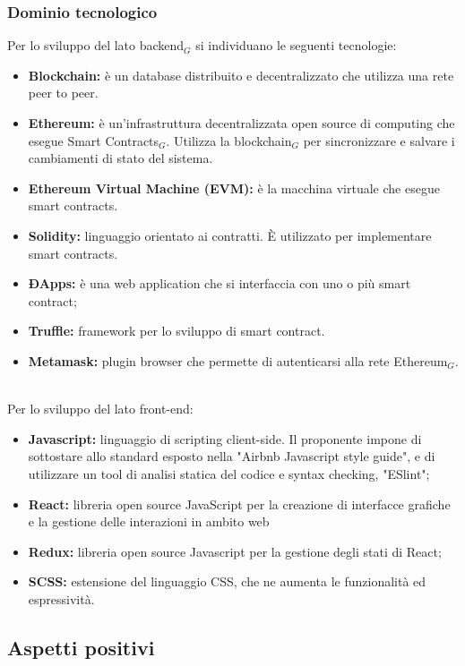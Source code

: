 \subsubsection{Dominio tecnologico}
Per lo sviluppo del lato backend$_{G}$ si individuano le seguenti tecnologie:
\begin{itemize}
    \item \textbf{Blockchain: }è un database distribuito e 
    decentralizzato che utilizza una rete peer to peer.
	\item \textbf{Ethereum: }è un'infrastruttura decentralizzata open source di computing che
	esegue Smart Contracts$_{G}$. Utilizza la blockchain$_{G}$ per sincronizzare e salvare i cambiamenti di stato
	del sistema.
	\item \textbf{Ethereum Virtual Machine (EVM): }è la macchina virtuale che esegue smart contracts.
	\item \textbf{Solidity: }linguaggio orientato ai contratti. \`E utilizzato per implementare smart contracts.
	\item \textbf{ÐApps: }è una web application che si interfaccia con uno o più smart contract;
	\item \textbf{Truffle: }framework per lo sviluppo di smart contract.
	\item \textbf{Metamask:} plugin browser che permette di autenticarsi alla rete Ethereum$_{G}$.

\end{itemize}
\mbox{}\\
Per lo sviluppo del lato front-end:
\begin{itemize}
	\item \textbf{Javascript:} linguaggio di scripting client-side. Il proponente impone di sottostare allo standard esposto nella "Airbnb Javascript style guide", e di utilizzare un tool di analisi statica del codice e syntax checking, "ESlint";
	\item \textbf{React:}  libreria open source JavaScript per la creazione di interfacce grafiche e la gestione delle interazioni in ambito web
	\item \textbf {Redux:} libreria open source Javascript per la gestione degli stati di React;
	\item \textbf{SCSS:} estensione del linguaggio CSS, che ne aumenta le funzionalità ed espressività.
\end{itemize}


\subsection{Aspetti positivi}

